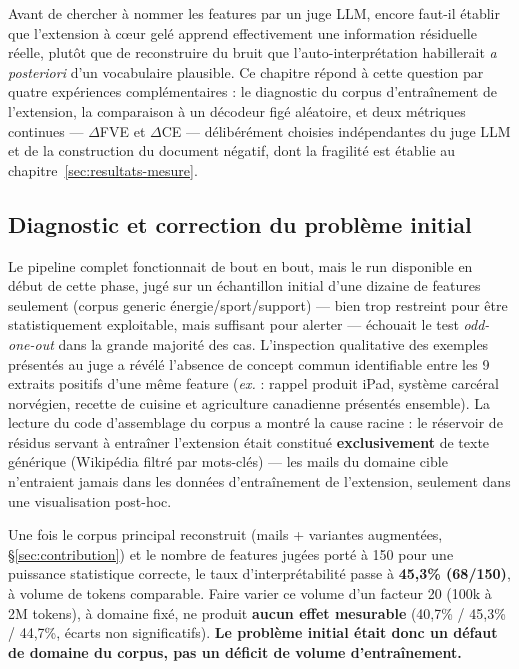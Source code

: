 \documentclass[11pt]{article}
\begin{document}
Avant de chercher à nommer les features par un juge LLM, encore faut-il établir
que l'extension à cœur gelé apprend effectivement une information résiduelle
réelle, plutôt que de reconstruire du bruit que l'auto-interprétation
habillerait \emph{a posteriori} d'un vocabulaire plausible. Ce chapitre répond
à cette question par quatre expériences complémentaires : le diagnostic du
corpus d'entraînement de l'extension, la comparaison à un décodeur figé
aléatoire, et deux métriques continues --- $\Delta$FVE et $\Delta$CE ---
délibérément choisies indépendantes du juge LLM et de la construction du
document négatif, dont la fragilité est établie au chapitre~\ref{sec:resultats-mesure}.

\subsection{Diagnostic et correction du problème initial}
\label{subsec:diagnostic-initial}

Le pipeline complet fonctionnait de bout en bout, mais le run disponible en
début de cette phase, jugé sur un échantillon initial d'une dizaine de
features seulement (corpus generic énergie/sport/support) --- bien trop
restreint pour être statistiquement exploitable, mais suffisant pour alerter
--- échouait le test \emph{odd-one-out} dans la grande majorité des cas.
L'inspection qualitative des exemples présentés au juge a révélé l'absence de
concept commun identifiable entre les 9 extraits
positifs d'une même feature (\emph{ex.} : rappel produit iPad, système
carcéral norvégien, recette de cuisine et agriculture canadienne présentés
ensemble). La lecture du code d'assemblage du corpus a montré la cause
racine : le réservoir de résidus servant à entraîner l'extension était
constitué \textbf{exclusivement} de texte générique (Wikipédia filtré par
mots-clés) --- les mails du domaine cible n'entraient jamais dans les données
d'entraînement de l'extension, seulement dans une visualisation post-hoc.

\begin{resultbox}
Une fois le corpus principal reconstruit (mails + variantes augmentées,
\S\ref{sec:contribution}) et le nombre de features jugées porté à 150 pour une
puissance statistique correcte, le taux d'interprétabilité passe à
\textbf{45,3\% (68/150)}, à volume de
tokens comparable. Faire varier ce volume d'un facteur 20 (100k à 2M tokens),
à domaine fixé, ne produit \textbf{aucun effet mesurable} (40,7\% / 45,3\% /
44,7\%, écarts non significatifs). \textbf{Le problème initial était donc un
défaut de domaine du corpus, pas un déficit de volume d'entraînement.}
\end{resultbox}
\end{document}
